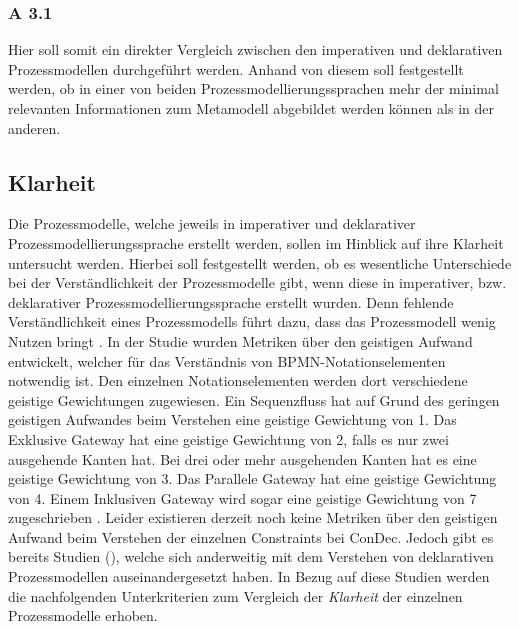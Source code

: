 \subsubsection{A 3.1}

Hier soll somit ein direkter Vergleich zwischen den imperativen und deklarativen Prozessmodellen durchgeführt werden. Anhand von diesem soll festgestellt werden, ob in einer von beiden Prozessmodellierungssprachen mehr der minimal relevanten Informationen zum Metamodell abgebildet werden können als in der anderen.\newline

\subsection{Klarheit}


Die Prozessmodelle, welche jeweils in imperativer und deklarativer Prozessmodellierungssprache erstellt werden, sollen im Hinblick auf ihre Klarheit untersucht werden. Hierbei soll festgestellt werden, ob es wesentliche Unterschiede bei der Verständlichkeit der Prozessmodelle gibt, wenn diese in imperativer, bzw. deklarativer Prozessmodellierungssprache erstellt wurden. Denn fehlende Verständlichkeit eines Prozessmodells führt dazu, dass das Prozessmodell wenig Nutzen bringt \cite{journals95, freund2007,reinshagen2009}. \newline
In der Studie \cite{gruhn2006adopting} wurden Metriken über den geistigen Aufwand entwickelt, welcher für das Verständnis von BPMN-Notationselementen notwendig ist. Den einzelnen Notationselementen werden dort verschiedene geistige Gewichtungen zugewiesen. Ein Sequenzfluss hat auf Grund des geringen geistigen Aufwandes beim Verstehen eine geistige Gewichtung von 1. Das Exklusive Gateway hat eine geistige Gewichtung von 2, falls es nur zwei ausgehende Kanten hat. Bei drei oder mehr ausgehenden Kanten hat es eine geistige Gewichtung von 3. Das Parallele Gateway hat eine geistige Gewichtung von 4. Einem Inklusiven Gateway wird sogar eine geistige Gewichtung von 7 zugeschrieben \cite{gruhn2006adopting}.\newline
Leider existieren derzeit noch keine Metriken über den geistigen Aufwand beim Verstehen der einzelnen Constraints bei ConDec. Jedoch gibt es bereits Studien (\cite{thesis_maja,haisjackl2014understanding}), welche sich anderweitig mit dem Verstehen von deklarativen Prozessmodellen auseinandergesetzt haben. In Bezug auf diese Studien werden die nachfolgenden Unterkriterien zum Vergleich der \textit{Klarheit} der einzelnen Prozessmodelle erhoben.


